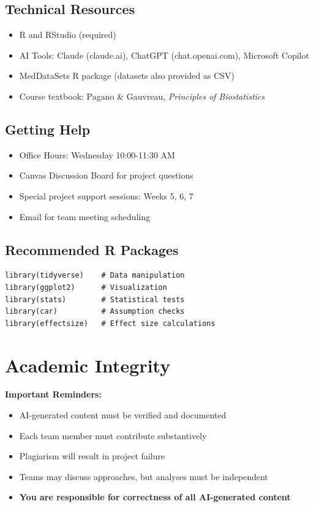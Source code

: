 \documentclass[11pt]{article}
\begin{document}
\subsection{Technical Resources}
\begin{itemize}
\item R and RStudio (required)
\item AI Tools: Claude (claude.ai), ChatGPT (chat.openai.com), Microsoft Copilot
\item MedDataSets R package (datasets also provided as CSV)
\item Course textbook: Pagano \& Gauvreau, \textit{Principles of Biostatistics}
\end{itemize}

\subsection{Getting Help}
\begin{itemize}
\item Office Hours: Wednesday 10:00-11:30 AM
\item Canvas Discussion Board for project questions
\item Special project support sessions: Weeks 5, 6, 7
\item Email for team meeting scheduling
\end{itemize}

\subsection{Recommended R Packages}
\begin{verbatim}
library(tidyverse)    # Data manipulation
library(ggplot2)      # Visualization
library(stats)        # Statistical tests
library(car)          # Assumption checks
library(effectsize)   # Effect size calculations
\end{verbatim}

\section{Academic Integrity}

\begin{tcolorbox}[colback=red!5,colframe=red,boxrule=1pt,arc=2pt,left=6pt,right=6pt,top=6pt,bottom=6pt]
\textbf{Important Reminders:}
\begin{itemize}
\item AI-generated content must be verified and documented
\item Each team member must contribute substantively
\item Plagiarism will result in project failure
\item Teams may discuss approaches, but analyses must be independent
\item \textbf{You are responsible for correctness of all AI-generated content}
\end{itemize}
\end{tcolorbox}
\end{document}
